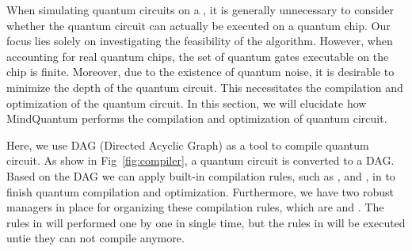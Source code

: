 

When simulating quantum circuits on a \Simulator, it is generally unnecessary to consider whether the quantum circuit can actually be executed on a quantum chip. Our focus lies solely on investigating the feasibility of the algorithm. However, when accounting for real quantum chips, the set of quantum gates executable on the chip is finite. Moreover, due to the existence of quantum noise, it is desirable to minimize the depth of the quantum circuit. This necessitates the compilation and optimization of the quantum circuit. In this section, we will elucidate how MindQuantum performs the compilation and optimization of quantum circuit.

Here, we use DAG (Directed Acyclic Graph) as a tool to compile quantum circuit. As show in Fig~\ref{fig:compiler}, a quantum circuit is converted to a DAG. Based on the DAG we can apply built-in compilation rules, such as \BasicDecompose, \FullyNeighborCanceler and \GateReplacer, in \MindQuantum to finish quantum compilation and optimization. Furthermore, we have two robust managers in place for organizing these compilation rules, which are \SequentialCompiler and \KroneckerSeqCompiler. The rules in \SequentialCompiler will performed one by one in single time, but the rules in \KroneckerSeqCompiler will be executed untie they can not compile anymore.

